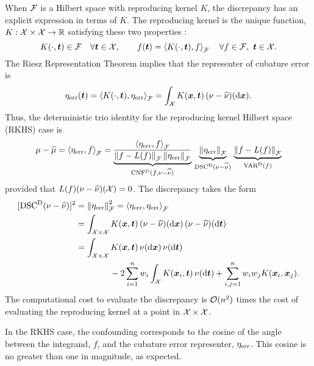 \documentclass[graybox,footinfo]{svmult}
\begin{document}
When $\calF$ is a Hilbert space with reproducing kernel $K$, the discrepancy has an 
explicit expression in terms of $K$.  The reproducing kernel is the unique function, $K: 
\calX \times \calX \to \R$ satisfying these two properties \cite[Sec.\ 1]{Aro50}:
\begin{equation}
K(\cdot,\bst) \in \calF \quad \forall \bst \in \calX, \qquad f(\bst) = 
\ip[\calF]{K(\cdot,\bst)}{f} 
\quad \forall f \in \calF, \ \bst \in \calX.
\end{equation}
The Riesz Representation Theorem implies that the representer of cubature error 
is 
\begin{equation}
\eta_{\err}(\bst) = \ip[\calF]{K(\cdot,\bst)}{\eta_{\err}} = \int_{\calX} K(\bsx,\bst) \, (\nu - 
\hnu)(\D\bsx).
\end{equation}
Thus, the deterministic trio identity for the reproducing kernel Hilbert space (RKHS) case 
is
\begin{equation}
\mu - \widehat{\mu} =  \ip[\calF]{\eta_{\err}}{f} = 
\underbrace{\frac{\ip[\calF]{\eta_{\err}}{f}}{\norm{f - 
L(f)}_{\calF} \norm{\eta_{\err}}_{\calF}} }_{\algn^\Dt(f,\nu - \hnu)}\, 
\underbrace{\norm{\eta_{\err}}_{\calF}}_{\disc^{\Dt}(\nu - \hnu)} \, 
\underbrace{\norm{f - L(f)}_{\calF}}_{\Var^\Dt(f)}
\end{equation}
provided that $L(f) (\nu - \hnu)(\calX) = 0$.  The discrepancy  takes the 
form \cite{Hic99a}
\begin{align}
\nonumber
[\disc^{\Dt}(\nu - \hnu)]^2 & = \norm{\eta_{\err}}_{\calF}^2 = 
\ip[\calF]{\eta_{\err}}{\eta_{\err}} 
\\
\nonumber
& = \int_{\calX \times \calX} K(\bsx,\bst) \, (\nu - \hnu)(\D \bsx) \, (\nu - \hnu)(\D \bst) \\
\nonumber
& = \int_{\calX \times \calX} K(\bsx,\bst) \, \nu(\D \bsx) \, \nu (\D \bst)  \\
& \qquad \qquad - 2 \sum_{i=1}^n w_i 
\int_{\calX} K(\bsx_i,\bst) \, \nu(\D \bst)+ \sum_{i,j = 1}^n w_iw_jK(\bsx_i,\bsx_j).
\end{align}
The computational cost to evaluate the discrepancy is $\calO(n^2)$ times the cost of 
evaluating the reproducing kernel at a point in $\calX \times \calX$. 

\begin{FJHLesson} \FJHLessonTwoHalf \end{FJHLesson}

In the RKHS case, the confounding corresponds to 
the cosine of the angle between the integrand, $f$, and the cubature error representer, 
$\eta_{\err}$.  This cosine is no greater than one in magnitude, as expected.
\end{document}
